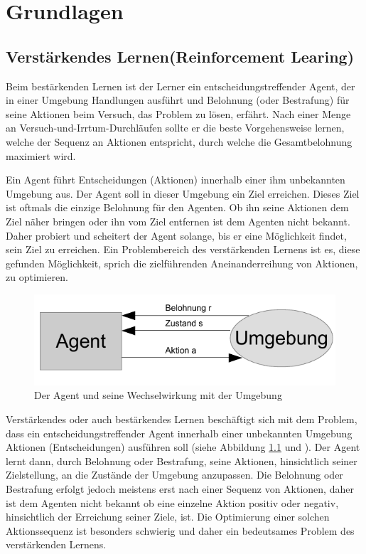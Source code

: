 \chapter{Grundlagen}
\label{ch:Grundlagen}


\section{Verstärkendes Lernen(Reinforcement Learing)}
Beim bestärkenden Lernen ist der Lerner ein entscheidungstreffender Agent, der in einer Umgebung Handlungen ausführt und Belohnung (oder Bestrafung) für seine Aktionen beim Versuch, das Problem zu lösen, erfährt. Nach einer Menge an Versuch-und-Irrtum-Durchläufen sollte er die beste Vorgehensweise lernen, welche der Sequenz an Aktionen entspricht, durch welche die Gesamtbelohnung maximiert wird\cite[397]{Alpaydin}.

Ein Agent führt Entscheidungen (Aktionen) innerhalb einer ihm unbekannten Umgebung aus. Der Agent soll in dieser Umgebung ein Ziel erreichen. Dieses Ziel ist oftmals die einzige Belohnung für den Agenten. Ob ihn seine Aktionen dem Ziel näher bringen oder ihn vom Ziel entfernen ist dem Agenten nicht bekannt. Daher probiert und scheitert der Agent solange, bis er eine Möglichkeit findet, sein Ziel zu erreichen. Ein Problembereich des verstärkenden Lernens ist es, diese gefunden Möglichkeit, sprich die zielführenden Aneinanderreihung von Aktionen, zu optimieren.

\begin{figure}[!htbp]
  \centering
  \includegraphics[scale = 1.4]{inhalt/abbildungen/agent_umgebung.pdf}
  \caption{Der Agent und seine Wechselwirkung mit der Umgebung}
  \label{fig:agent_umgebung}
\end{figure} 

Verstärkendes oder auch bestärkendes Lernen beschäftigt sich mit dem Problem, dass ein entscheidungstreffender Agent innerhalb einer unbekannten Umgebung Aktionen (Entscheidungen) ausführen soll (siehe Abbildung \ref{fig:agent_umgebung} \cite[\acs{vgl.} 398]{Alpaydin} und \cite[\acs{vgl.} 290]{Ertel}). Der Agent lernt dann, durch Belohnung oder Bestrafung, seine Aktionen, hinsichtlich seiner Zielstellung, an die Zustände der Umgebung anzupassen. Die Belohnung oder Bestrafung erfolgt jedoch meistens erst nach einer Sequenz von Aktionen, daher ist dem Agenten nicht bekannt ob eine einzelne Aktion positiv oder negativ, hinsichtlich der Erreichung seiner Ziele, ist. Die Optimierung einer solchen Aktionssequenz ist besonders schwierig und daher ein bedeutsames Problem des verstärkenden Lernens.\\

